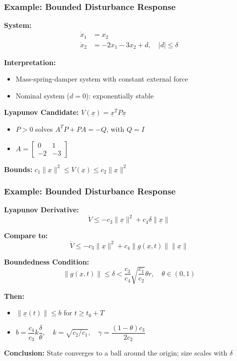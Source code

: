 \documentclass[student, noshadow, lsr, english, aspectratio=169, t]{ITR_LSR_slides}
\begin{document}
\begin{frame}
	\frametitle{Example: Bounded Disturbance Response}

	\textbf{System:}
	\begin{align*}
		\dot{x}_1 &= x_2 \\
		\dot{x}_2 &= -2x_1 - 3x_2 + d, \quad |d| \leq \delta
	\end{align*}

	\textbf{Interpretation:}
	\begin{itemize}
		\item Mass-spring-damper system with constant external force
		\item Nominal system ($d = 0$): exponentially stable
	\end{itemize}

	\vspace{0.3em}

	\textbf{Lyapunov Candidate:} $V(\underline{x}) = \underline{x}^T P \underline{x}$

	\vspace{0.3em}
	\begin{itemize}
		\item $P > 0$ solves $A^T P + P A = -Q$, with $Q = I$
		\item $A = \begin{bmatrix} 0 & 1 \\ -2 & -3 \end{bmatrix}$
	\end{itemize}

	\vspace{0.3em}
	\textbf{Bounds:} \quad $c_1 \|\underline{x}\|^2 \leq V(\underline{x}) \leq c_2 \|\underline{x}\|^2$
\end{frame}


\begin{frame}
	\frametitle{Example: Bounded Disturbance Response}

	\textbf{Lyapunov Derivative:}
	\[
		\dot{V} \leq -c_3 \|\underline{x}\|^2 + c_4 \delta \|\underline{x}\|
	\]

	\textbf{Compare to:}
	\[
		\dot{V} \leq -c_3 \|\underline{x}\|^2 + c_4 \|g(\underline{x}, t)\| \|\underline{x}\|
	\]

	\textbf{Boundedness Condition:}
	\[
		\|g(\underline{x}, t)\| \leq \delta < \frac{c_3}{c_4} \sqrt{\frac{c_1}{c_2}} \theta r, \quad \theta \in (0,1)
	\]

	\vspace{0.3em}
	\textbf{Then:}
	\begin{itemize}
		\item $\|\underline{x}(t)\| \leq b$ for $t \geq t_0 + T$
		\item $b = \dfrac{c_4}{c_3} k \dfrac{\delta}{\theta}, \quad k = \sqrt{c_2/c_1}, \quad \gamma = \dfrac{(1 - \theta)c_3}{2c_2}$
	\end{itemize}

	\vspace{0.3em}
	\textbf{Conclusion:} State converges to a ball around the origin; size scales with $\delta$
\end{frame}
\end{document}
